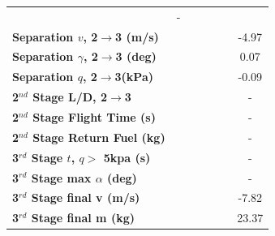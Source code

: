 \begin{table}[ht]
\begin{tabular}{l c c c c c c}
		& -
		\\
		\textbf{Separation $v$, 2$\rightarrow$3 (m/s)}
		& \secondthirdSeparationvmThreeNinety
		& \secondthirdSeparationvmThreeNinetyFive
		& \secondthirdSeparationvmThreeStandard
		& \secondthirdSeparationvmThreeOneHundredFive
		& \secondthirdSeparationvmThreeOneHundredTen
		&-4.97
		\\
		\textbf{Separation $\gamma$, 2$\rightarrow$3 (deg)}
		& \secondthirdSeparationgammamThreeNinety
		& \secondthirdSeparationgammamThreeNinetyFive
		& \secondthirdSeparationgammamThreeStandard
		& \secondthirdSeparationgammamThreeOneHundredFive
		& \secondthirdSeparationgammamThreeOneHundredTen
		&0.07
		\\
		\textbf{Separation $q$, 2$\rightarrow$3(kPa)}
		& \secondthirdSeparationqmThreeNinety
		& \secondthirdSeparationqmThreeNinetyFive
		& \secondthirdSeparationqmThreeStandard
		& \secondthirdSeparationqmThreeOneHundredFive
		& \secondthirdSeparationqmThreeOneHundredTen
		&-0.09
		\\
		\textbf{2$^{nd}$ Stage L/D, 2$\rightarrow$3}
		& \secondthirdSeparationLDmThreeNinety
		& \secondthirdSeparationLDmThreeNinetyFive
		& \secondthirdSeparationLDmThreeStandard
		& \secondthirdSeparationLDmThreeOneHundredFive
		& \secondthirdSeparationLDmThreeOneHundredTen
		& -
		\\
		\textbf{2$^{nd}$ Stage Flight Time (s)}
		& \secondFlightTimemThreeNinety
		& \secondFlightTimemThreeNinetyFive
		& \secondFlightTimemThreeStandard
		& \secondFlightTimemThreeOneHundredFive
		& \secondFlightTimemThreeOneHundredTen
		& -
		\\
		\textbf{2$^{nd}$ Stage Return Fuel (kg)}
		& \returnFuelmThreeNinety
		& \returnFuelmThreeNinetyFive
		& \returnFuelmThreeStandard
		& \returnFuelmThreeOneHundredFive
		& \returnFuelmThreeOneHundredTen
		& -
		\\
		\textbf{3$^{rd}$ Stage $t$, $q >$ 5kpa (s)}
		& \thirdqOverFivemThreeNinety
		& \thirdqOverFivemThreeNinetyFive
		& \thirdqOverFivemThreeStandard
		& \thirdqOverFivemThreeOneHundredFive
		& \thirdqOverFivemThreeOneHundredTen
		& -
		\\
		\textbf{3$^{rd}$ Stage max $\alpha$ (deg)}
		& \thirdmaxAoAmThreeNinety
		& \thirdmaxAoAmThreeNinetyFive
		& \thirdmaxAoAmThreeStandard
		& \thirdmaxAoAmThreeOneHundredFive
		& \thirdmaxAoAmThreeOneHundredTen
		& -
		\\
		\textbf{3$^{rd}$ Stage final v (m/s)}
		& \thirdcircvmThreeNinety
		& \thirdcircvmThreeNinetyFive
		& \thirdcircvmThreeStandard
		& \thirdcircvmThreeOneHundredFive
		& \thirdcircvmThreeOneHundredTen
		&-7.82
		\\
		\textbf{3$^{rd}$ Stage final m (kg)}
		& \thirdcircmmThreeNinety
		& \thirdcircmmThreeNinetyFive
		& \thirdcircmmThreeStandard
		& \thirdcircmmThreeOneHundredFive
		& \thirdcircmmThreeOneHundredTen
		&23.37
		\\
		\hline 
	\end{tabular} 
\end{table}

